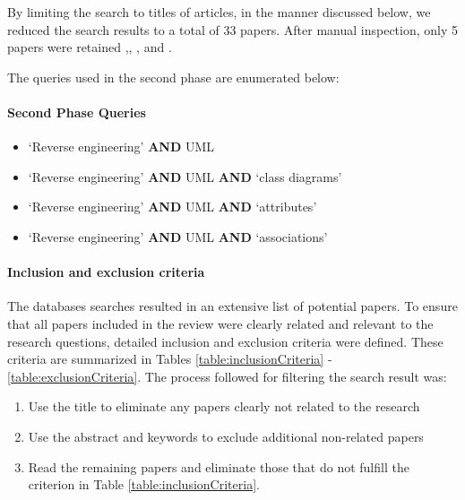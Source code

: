 By limiting the search to titles of articles, in the manner discussed below, we reduced the search results to a total of 33 papers. After manual inspection, only 5 papers were retained \cite{surveyMens},\cite{biehl2010literature}, \cite{DynamicSurvey}, \cite{Nelson1996} and \cite{Chikofsky}. 

The queries used in the second phase are enumerated below:

\paragraph*{Second Phase Queries}

\begin{itemize}
\item `Reverse engineering' \textbf{AND}  UML 
\item `Reverse engineering' \textbf{AND}  UML \textbf{AND} `class diagrams'
\item `Reverse engineering' \textbf{AND}  UML \textbf{AND}  `attributes'
\item `Reverse engineering' \textbf{AND}  UML \textbf{AND} `associations'
\end{itemize}

\paragraph*{Inclusion and exclusion criteria}

The databases searches resulted in an extensive list of potential papers. To ensure that all papers included in the review were clearly related and relevant to the research questions, detailed inclusion and exclusion criteria were defined. These criteria are summarized in Tables \ref{table:inclusionCriteria} - \ref{table:exclusionCriteria}. 
 The process followed for filtering the search result was:

\begin{enumerate}
\item Use the title to eliminate any papers clearly not related to the research

\item Use the abstract and keywords to exclude additional non-related papers

\item Read the remaining papers and eliminate those that do not fulfill the criterion in Table \ref{table:inclusionCriteria}.
\end{enumerate}


